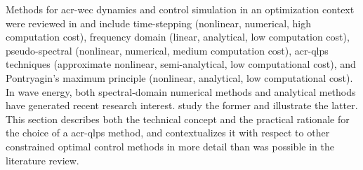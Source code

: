 \ifdefined\DISSERTATION
    Methods for \gls{acr-wec} dynamics and control simulation in an optimization context were reviewed in  and include time-stepping (nonlinear, numerical, high computation cost), frequency domain (linear, analytical, low computation cost), pseudo-spectral (nonlinear, numerical, medium computation cost), \gls{acr-qlps} techniques (approximate nonlinear, semi-analytical, low computational cost), and Pontryagin's maximum principle (nonlinear, analytical, low computational cost).
    In wave energy, both spectral-domain numerical methods and analytical methods have generated recent research interest. \citet{bacelli_numerical_2015,coe_initial_2020,tan_computationally_2026,nie_optimal_2016,da_silva_stochastic_2023} study the former and \citet{abdulkadir_optimal_2024,lin_fast_2025} illustrate the latter.
    This section describes both the technical concept and the practical rationale for the choice of a \gls{acr-qlps} method, and contextualizes it with respect to other constrained optimal control methods in more detail than was possible in the literature review.

